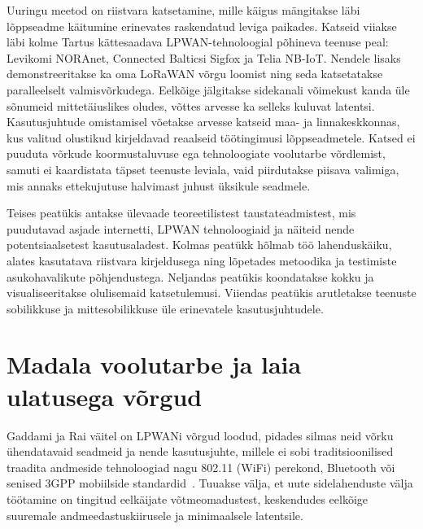 \documentclass[12pt]{article}
\begin{document}
    Uuringu meetod on riistvara katsetamine, mille käigus mängitakse läbi lõppseadme käitumine erinevates raskendatud leviga paikades.
    Katseid viiakse läbi kolme Tartus kättesaadava LPWAN-tehnoloogial põhineva teenuse peal: Levikomi NORAnet, Connected Balticsi Sigfox ja Telia NB-IoT.
    Nendele lisaks demonstreeritakse ka oma LoRaWAN võrgu loomist ning seda katsetatakse paralleelselt valmisvõrkudega.
    Eelkõige jälgitakse sidekanali võimekust kanda üle sõnumeid mittetäiuslikes oludes, võttes arvesse ka selleks kuluvat latentsi.
    Kasutusjuhtude omistamisel võetakse arvesse katseid maa- ja linnakeskkonnas, kus valitud olustikud kirjeldavad reaalseid töötingimusi lõppseadmetele.
    Katsed ei puuduta võrkude koormustaluvuse ega tehnoloogiate voolutarbe võrdlemist, samuti ei kaardistata täpset teenuste leviala, vaid piirdutakse piisava valimiga, mis annaks ettekujutuse halvimast juhust üksikule seadmele.

    Teises peatükis antakse ülevaade teoreetilistest taustateadmistest, mis puudutavad asjade internetti, LPWAN tehnoloogiaid ja näiteid nende potentsiaalsetest kasutusaladest.
    Kolmas peatükk hõlmab töö lahenduskäiku, alates kasutatava riistvara kirjeldusega ning lõpetades metoodika ja testimiste asukohavalikute põhjendustega.
    Neljandas peatükis koondatakse kokku ja visualiseeritakse olulisemaid katsetulemusi.
    Viiendas peatükis arutletakse teenuste sobilikkuse ja mittesobilikkuse üle erinevatele kasutusjuhtudele.

    \newpage


    \section{Madala voolutarbe ja laia ulatusega võrgud}

    Gaddami ja Rai väitel on LPWANi võrgud loodud, pidades silmas neid võrku ühendatavaid seadmeid ja nende kasutusjuhte, millele ei sobi traditsioonilised traadita andmeside tehnoloogiad nagu 802.11 (WiFi) perekond, Bluetooth või senised 3GPP mobiilside standardid~\cite{gaddam2018comparative}.
    Tuuakse välja, et uute sidelahenduste välja töötamine on tingitud eelkäijate võtmeomadustest, keskendudes eelkõige suuremale andmeedastuskiirusele ja minimaalsele latentsile.
\end{document}

